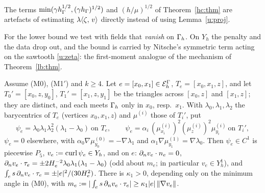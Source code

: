The terms $\min(\gamma h_\Gamma^{1/2},(\gamma h_\Gamma)^{1/2})$ and $(h/\mu)^{1/2}$ of Theorem~\ref{hc:thm} are artefacts of estimating $\lambda\langle \zeta,\, v\rangle$ directly instead of using Lemma~\ref{u:proj}.

For the lower bound we test with fields that \emph{vanish} on $\Gamma_h$. On $Y_h$ the penalty and the data drop out, and the bound is carried by Nitsche's symmetric term acting on the sawtooth \eqref{u:zeta}: the first-moment analogue of the mechanism of Theorem~\ref{lb:thm}.

\begin{lemma}\label{u:field}
Assume (M0), (M1$'$) and $k\ge4$. Let $e=[x_0,x_1]\in\mathcal E_h^\Gamma$, $T_e=[x_0,x_1,z]$, and let $T_0'=[x_0,z,y_0]$, $T_1'=[x_1,z,y_1]$ be the triangles across $[x_0,z]$ and $[x_1,z]$; they are distinct, and each meets $\Gamma_h$ only in $x_0$, resp.\ $x_1$. With $\lambda_0,\lambda_1,\lambda_2$ the barycentrics of $T_e$ (vertices $x_0,x_1,z$) and $\mu^{(i)}$ those of $T_i'$, put
\[
\psi_e=\lambda_0\lambda_1\lambda_2^2(\lambda_1-\lambda_0)\ \text{on }T_e,\qquad
\psi_e=\alpha_i\,(\mu^{(i)}_{x_i})^2(\mu^{(i)}_z)^2\mu^{(i)}_{y_i}\ \text{on }T_i',
\]
$\psi_e=0$ elsewhere, with $\alpha_0\nabla\mu^{(0)}_{y_0}=-\nabla\lambda_1$ and $\alpha_1\nabla\mu^{(1)}_{y_1}=\nabla\lambda_0$. Then $\psi_e\in C^1$ is piecewise $P_5$, $v_e:=\operatorname{curl}\psi_e\in Y_h$, and on $e$: $\partial_n v_e\cdot n_e=0$, $\partial_n v_e\cdot\tau_e=\pm2H_e^{-2}\lambda_0\lambda_1(\lambda_1-\lambda_0)$ (odd about $m_e$; in particular $v_e\in Y_h^1$), and $\int_es\,\partial_n v_e\cdot\tau_e=\pm|e|^2/(30H_e^2)$. There is $\kappa_1>0$, depending only on the minimum angle in (M0), with $m_e:=|\int_es\,\partial_n v_e\cdot\tau_e|\ge\kappa_1|e|\,\lVert \nabla v_e\rVert$.
\end{lemma}

